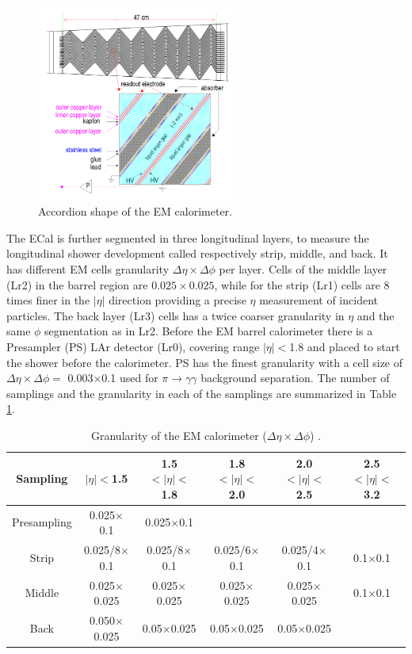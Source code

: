\begin{figure}[htbp]
    \centering
    \includegraphics[width=0.6\textwidth]{Ch2/Img/ECal_accord.png}
    \caption{Accordion shape of the EM calorimeter.}
    \label{fig:chap2:ATLAS:Calo:ECal:Acc}
\end{figure}
The ECal is further segmented in three longitudinal layers, to measure the longitudinal shower development called respectively strip, middle, and back. It has different EM cells granularity $\Delta\eta\times\Delta\phi$ per layer. Cells of the middle layer (Lr2) in the barrel region are $0.025\times0.025$, while for the strip (Lr1) cells are 8 times finer in the $|\eta|$ direction providing a precise $\eta$ measurement of incident particles. The back layer (Lr3) cells has a twice coarser granularity in $\eta$ and the same $\phi$ segmentation as in Lr2. Before the EM barrel calorimeter there is a Presampler (PS) LAr detector (Lr0), covering range $|\eta|<$1.8 and placed to start the shower before the calorimeter. PS has the finest granularity with a cell size of $\Delta\eta\times\Delta\phi =$  0.003$\times$0.1 used for $\pi\rightarrow\gamma\gamma$ background separation. The number of samplings  and the granularity in each of the samplings are summarized in Table \ref{tab:chap2:ATLAS:Calo:ECal:Gr}.
\begin{table}[htbp]
    \centering
    \begin{tabular}{cccccc}
    \hline
    Sampling & $|\eta|<$1.5 & 1.5$<|\eta|<$1.8 & 1.8$<|\eta|<$2.0 & 2.0$<|\eta|<$2.5 & 2.5$<|\eta|<$3.2 \\
    \hline
    \hline
        Presampling & 0.025$\times$0.1 & 0.025$\times$0.1  \\
        Strip & 0.025/8$\times$0.1 & 0.025/8$\times$0.1 & 0.025/6$\times$0.1 & 0.025/4$\times$0.1 & 0.1$\times$0.1 \\
        Middle & 0.025$\times$0.025 & 0.025$\times$0.025 & 0.025$\times$0.025 & 0.025$\times$0.025 & 0.1$\times$0.1 \\
        Back & 0.050$\times$0.025 & 0.05$\times$0.025 & 0.05$\times$0.025 & 0.05$\times$0.025 \\
        \hline
    \end{tabular}
    \caption{Granularity of the EM calorimeter ($\Delta\eta\times\Delta\phi$) \cite{LAr_TRD}.}
    \label{tab:chap2:ATLAS:Calo:ECal:Gr}
\end{table}
